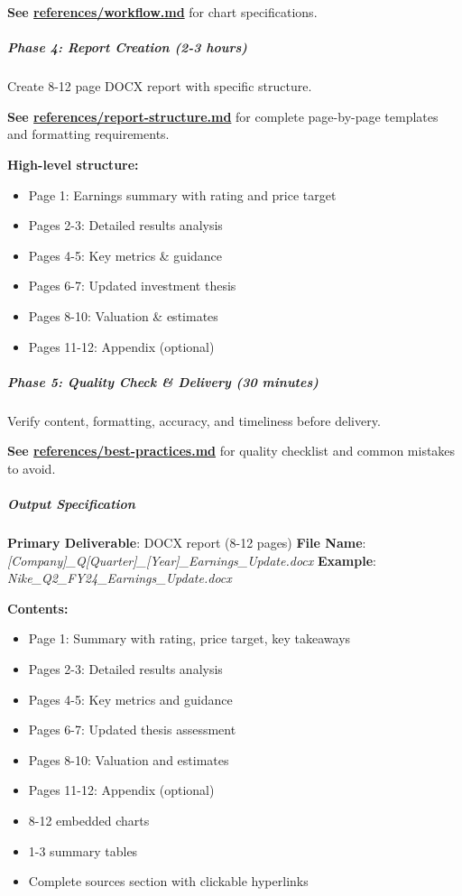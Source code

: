 \documentclass[11pt]{article}
\begin{document}
\textbf{See \href{references/workflow.md}{references/workflow.md}} for chart specifications.


\subparagraph{Phase 4: Report Creation (2-3 hours)}\mbox{}\par
Create 8-12 page DOCX report with specific structure.


\textbf{See \href{references/report-structure.md}{references/report-structure.md}} for complete page-by-page templates and formatting requirements.


\textbf{High-level structure:}

\begin{itemize}[leftmargin=*,itemsep=2pt,topsep=2pt]
\item {} Page 1: Earnings summary with rating and price target
\item {} Pages 2-3: Detailed results analysis
\item {} Pages 4-5: Key metrics \& guidance
\item {} Pages 6-7: Updated investment thesis
\item {} Pages 8-10: Valuation \& estimates
\item {} Pages 11-12: Appendix (optional)
\end{itemize}

\subparagraph{Phase 5: Quality Check \& Delivery (30 minutes)}\mbox{}\par
Verify content, formatting, accuracy, and timeliness before delivery.


\textbf{See \href{references/best-practices.md}{references/best-practices.md}} for quality checklist and common mistakes to avoid.


\subparagraph{Output Specification}\mbox{}\par

\textbf{Primary Deliverable}: DOCX report (8-12 pages) \textbf{File Name}: \emph{[Company]\_\allowbreak{}Q[Quarter]\_\allowbreak{}[Year]\_\allowbreak{}Earnings\_\allowbreak{}Update.docx} \textbf{Example}: \emph{Nike\_\allowbreak{}Q2\_\allowbreak{}FY24\_\allowbreak{}Earnings\_\allowbreak{}Update.docx}


\textbf{Contents:}

\begin{itemize}[leftmargin=*,itemsep=2pt,topsep=2pt]
\item {} Page 1: Summary with rating, price target, key takeaways
\item {} Pages 2-3: Detailed results analysis
\item {} Pages 4-5: Key metrics and guidance
\item {} Pages 6-7: Updated thesis assessment
\item {} Pages 8-10: Valuation and estimates
\item {} Pages 11-12: Appendix (optional)
\item {} 8-12 embedded charts
\item {} 1-3 summary tables
\item {} Complete sources section with clickable hyperlinks
\end{itemize}
\end{document}
